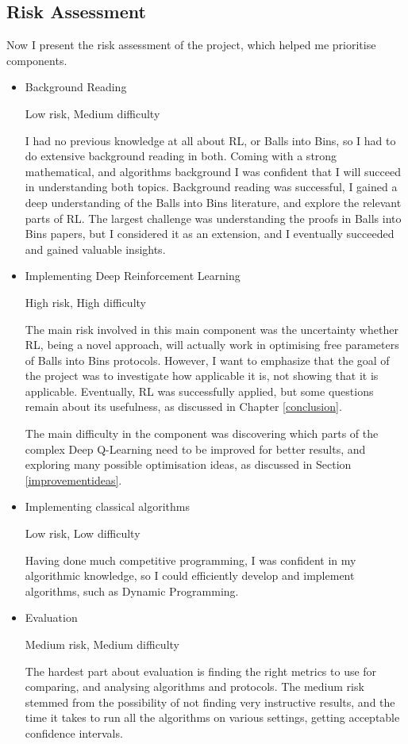 \subsection{Risk Assessment}

Now I present the risk assessment of the project, which helped me prioritise components.

\begin{itemize}
    \item Background Reading
    
    Low risk, Medium difficulty
    
    I had no previous knowledge at all about RL, or Balls into Bins, so I had to do extensive background reading in both. Coming with a strong mathematical, and algorithms background I was confident that I will succeed in understanding both topics. Background reading was successful, I gained a deep understanding of the Balls into Bins literature, and explore the relevant parts of RL. The largest challenge was understanding the proofs in Balls into Bins papers, but I considered it as an extension, and I eventually succeeded and gained valuable insights.
    \item Implementing Deep Reinforcement Learning
    
    High risk, High difficulty
    
    The main risk involved in this main component was the uncertainty whether RL, being a novel approach, will actually work in optimising free parameters of Balls into Bins protocols. However, I want to emphasize that the goal of the project was to investigate how applicable it is, not showing that it is applicable. Eventually, RL was successfully applied, but some questions remain about its usefulness, as discussed in Chapter \ref{conclusion}.
    
    
    The main difficulty in the component was discovering which parts of the complex Deep Q-Learning need to be improved for better results, and exploring many possible optimisation ideas, as discussed in Section \ref{improvementideas}.
    
    \item Implementing classical algorithms
    
    Low risk, Low difficulty
    
    Having done much competitive programming, I was confident in my algorithmic knowledge, so I could efficiently develop and implement algorithms, such as Dynamic Programming.
    
    \item Evaluation
    
    Medium risk, Medium difficulty
    
    The hardest part about evaluation is finding the right metrics to use for comparing, and analysing algorithms and protocols. The medium risk stemmed from the possibility of not finding very instructive results, and the time it takes to run all the algorithms on various settings, getting acceptable confidence intervals.
    
    
\end{itemize}